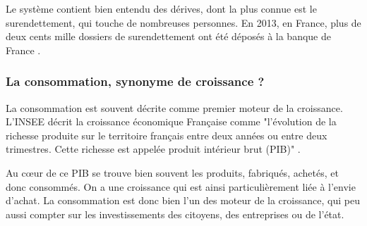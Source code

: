 Le système contient bien entendu des dérives, dont la plus connue est le surendettement, qui touche de nombreuses personnes. En 2013, en France, plus de deux cents mille dossiers de surendettement ont été déposés à la banque de France \cite{BanqueFranceEndettement}.


\subsubsection{La consommation, synonyme de croissance ?}
La consommation est souvent décrite comme premier moteur de la croissance. L'INSEE  décrit la croissance économique Française comme "l’évolution de la richesse produite sur le territoire français entre deux années ou entre deux trimestres. Cette richesse est appelée produit intérieur brut (PIB)" \cite{INSEEcroissance}.

Au cœur de ce PIB se trouve bien souvent les produits, fabriqués, achetés, et donc consommés. On a une croissance qui est ainsi particulièrement liée à l'envie d'achat. La consommation est donc bien l'un des moteur de la croissance, qui peu aussi compter sur les investissements des citoyens, des entreprises ou de l'état.


